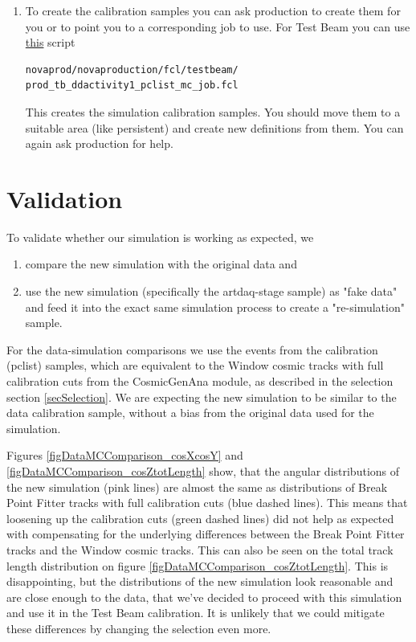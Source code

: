 \documentclass[12pt]{article}
\begin{document}
\begin{enumerate}
\item To create the calibration samples you can ask production to create them for you or to point you to a corresponding job to use. For Test Beam you can use \href{https://github.com/novaexperiment/novaprod/blob/main/novaproduction/fcl/testbeam/prod\_tb\_ddactivity1\_pclist\_mc\_job.fcl}{this} script
\begin{lstlisting}[frame=single,language=bash]
novaprod/novaproduction/fcl/testbeam/
prod_tb_ddactivity1_pclist_mc_job.fcl
\end{lstlisting}
This creates the simulation calibration samples. You should move them to a suitable area (like persistent) and create new definitions from them. You can again ask production for help.
\end{enumerate}

\section{Validation}
To validate whether our simulation is working as expected, we
\begin{enumerate}
\item compare the new simulation with the original data and
\item use the new simulation (specifically the artdaq-stage sample) as "fake data" and feed it into the exact same simulation process to create a "re-simulation" sample.
\end{enumerate}

For the data-simulation comparisons we use the events from the calibration (pclist) samples, which are equivalent to the Window cosmic tracks with full calibration cuts from the CosmicGenAna module, as described in the selection section \ref{secSelection}. We are expecting the new simulation to be similar to the data calibration sample, without a bias from the original data used for the simulation.

Figures \ref{figDataMCComparison_cosXcosY} and \ref{figDataMCComparison_cosZtotLength} show, that the angular distributions of the new simulation (pink lines) are almost the same as distributions of Break Point Fitter tracks with full calibration cuts (blue dashed lines). This means that loosening up the calibration cuts (green dashed lines) did not help as expected with compensating for the underlying differences between the Break Point Fitter tracks and the Window cosmic tracks. This can also be seen on the total track length distribution on figure \ref{figDataMCComparison_cosZtotLength}. This is disappointing, but the distributions of the new simulation look reasonable and are close enough to the data, that we've decided to proceed with this simulation and use it in the Test Beam calibration. It is unlikely that we could mitigate these differences by changing the selection even more.
\end{document}
